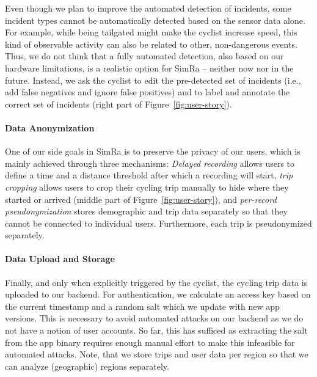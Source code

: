 Even though we plan to improve the automated detection of incidents, some incident types cannot be automatically detected based on the sensor data alone.
For example, while being tailgated might make the cyclist increase speed, this kind of observable activity can also be related to other, non-dangerous events.
Thus, we do not think that a fully automated detection, also based on our hardware limitations, is a realistic option for SimRa -- neither now nor in the future.
Instead, we ask the cyclist to edit the pre-detected set of incidents (i.e., add false negatives and ignore false positives) and to label and annotate the correct set of incidents (right part of Figure~\ref{fig:user-story}).

\paragraph{Data Anonymization}

One of our side goals in SimRa is to preserve the privacy of our users, which is mainly achieved through three mechanisms: \emph{Delayed recording} allows users to define a time and a distance threshold after which a recording will start, \emph{trip cropping} allows users to crop their cycling trip manually to hide where they started or arrived (middle part of Figure~\ref{fig:user-story}), and \emph{per-record pseudonymization} stores demographic and trip data separately so that they cannot be connected to individual users.
Furthermore, each trip is pseudonymized separately.

\paragraph{Data Upload and Storage}
Finally, and only when explicitly triggered by the cyclist, the cycling trip data is uploaded to our backend.
For authentication, we calculate an access key based on the current timestamp and a random salt which we update with new app versions.
This is necessary to avoid automated attacks on our backend as we do not have a notion of user accounts.
So far, this has sufficed as extracting the salt from the app binary requires enough manual effort to make this infeasible for automated attacks.
Note, that we store trips and user data per region so that we can analyze (geographic) regions separately.

